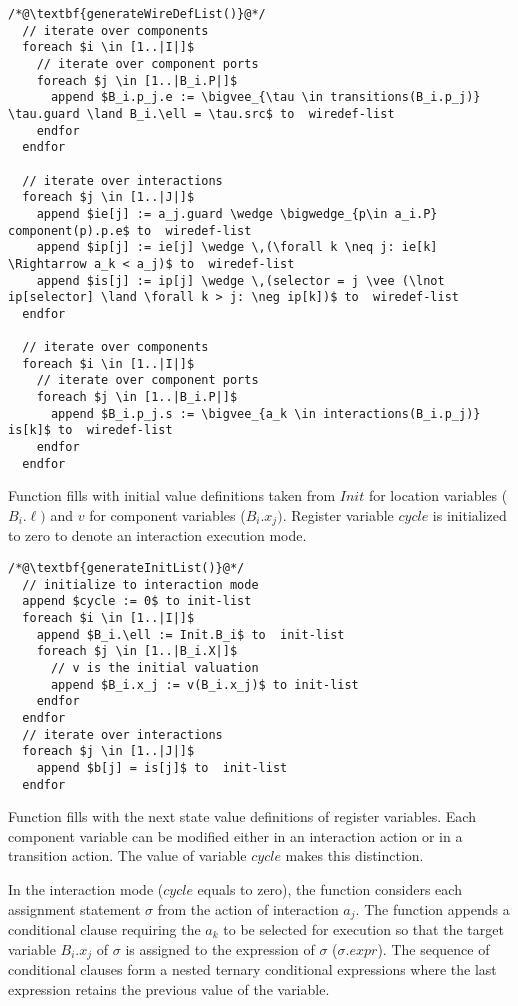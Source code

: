  
\begin{lstlisting}
/*@\textbf{generateWireDefList()}@*/
  // iterate over components
  foreach $i \in [1..|I|]$ 
    // iterate over component ports
    foreach $j \in [1..|B_i.P|]$ 
      append $B_i.p_j.e := \bigvee_{\tau \in transitions(B_i.p_j)} \tau.guard \land B_i.\ell = \tau.src$ to  wiredef-list 
    endfor
  endfor
  
  // iterate over interactions
  foreach $j \in [1..|J|]$ 
    append $ie[j] := a_j.guard \wedge \bigwedge_{p\in a_i.P} component(p).p.e$ to  wiredef-list 
    append $ip[j] := ie[j] \wedge \,(\forall k \neq j: ie[k] \Rightarrow a_k < a_j)$ to  wiredef-list 
    append $is[j] := ip[j] \wedge \,(selector = j \vee (\lnot ip[selector] \land \forall k > j: \neg ip[k])$ to  wiredef-list 
  endfor
  
  // iterate over components
  foreach $i \in [1..|I|]$ 
    // iterate over component ports
    foreach $j \in [1..|B_i.P|]$ 
      append $B_i.p_j.s := \bigvee_{a_k \in interactions(B_i.p_j)} is[k]$ to  wiredef-list 
    endfor
  endfor
\end{lstlisting}

Function  fills  with initial value definitions taken from $Init$ for location variables ($B_i.\ell)$ and $v$ for component variables ($B_i.x_j)$. Register variable $cycle$ is initialized to zero to denote an interaction execution mode. 

\begin{lstlisting}
/*@\textbf{generateInitList()}@*/
  // initialize to interaction mode
  append $cycle := 0$ to init-list 
  foreach $i \in [1..|I|]$
    append $B_i.\ell := Init.B_i$ to  init-list 
    foreach $j \in [1..|B_i.X|]$
      // v is the initial valuation
      append $B_i.x_j := v(B_i.x_j)$ to init-list  
    endfor
  endfor
  // iterate over interactions
  foreach $j \in [1..|J|]$ 
    append $b[j] = is[j]$ to  init-list 
  endfor
\end{lstlisting}

Function  fills  with the next state value definitions of register variables. Each component variable can be modified either in an interaction action or in a transition action. The value of variable $cycle$ makes this distinction. 

In the interaction mode ($cycle$ equals to zero), the function considers each assignment statement $\sigma$ from the action of interaction $a_j$. The function appends a conditional clause requiring the $a_k$ to be selected for execution so that the target variable $B_i.x_j$ of $\sigma$ is assigned to the expression of $\sigma$ ($\sigma.expr$). The sequence of conditional clauses form a nested ternary conditional expressions where the last expression retains the previous value of the variable. 

